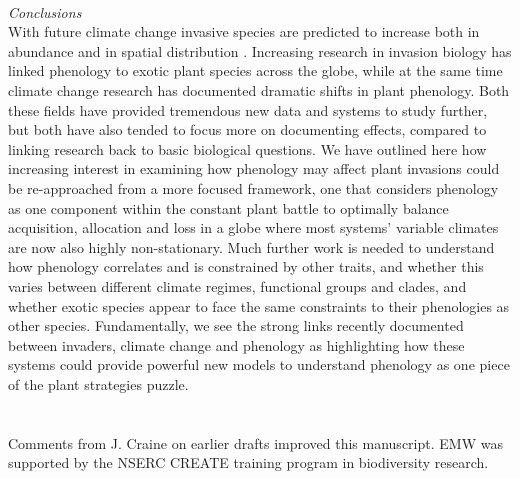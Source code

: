 \documentclass[11pt,a4paper,oneside]{article}
\begin{document}
 \\
\noindent \emph{Conclusions}\\
With future climate change invasive species are predicted to increase both in abundance and in spatial distribution \citep{ipcc2007summary,bradley2010}. Increasing research in invasion biology has linked phenology to exotic plant species across the globe, while at the same time climate change research has documented dramatic shifts in plant phenology. Both these fields have provided tremendous new data and systems to study further, but both have also tended to focus more on documenting effects, compared to linking research back to basic biological questions. We have outlined here how increasing interest in examining how phenology may affect plant invasions could be re-approached from a more focused framework, one that considers phenology as one component within the constant plant battle to optimally balance acquisition, allocation and loss in a globe where most systems' variable climates are now also highly non-stationary. Much further work is needed to understand how phenology correlates and is constrained by other traits, and whether this varies between different climate regimes, functional groups and clades, and whether exotic species appear to face the same constraints to their phenologies as other species. Fundamentally, we see the strong links recently documented between invaders, climate change and phenology as highlighting how these systems could provide powerful new models to understand phenology as one piece of the plant strategies puzzle. \\
\\
\\
Comments from J. Craine on earlier drafts improved this manuscript. EMW was supported by the NSERC CREATE training program in biodiversity research.  

\newpage

\end{document}
